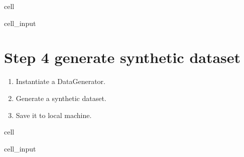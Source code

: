 \documentclass[letterpaper,10pt,english]{jupyterBook}
\begin{document}
\begin{sphinxuseclass}{cell}\begin{sphinxVerbatimInput}

\begin{sphinxuseclass}{cell_input}
\begin{sphinxVerbatim}[commandchars=\\\{\}]
  
\end{sphinxVerbatim}

\end{sphinxuseclass}\end{sphinxVerbatimInput}

\end{sphinxuseclass}

\section{Step 4 generate synthetic dataset}
\label{\detokenize{src/test/SynthNAV0:step-4-generate-synthetic-dataset}}\begin{enumerate}
%
\item {} 
\sphinxAtStartPar
Instantiate a DataGenerator.

\item {} 
\sphinxAtStartPar
Generate a synthetic dataset.

\item {} 
\sphinxAtStartPar
Save it to local machine.

\end{enumerate}

\begin{sphinxuseclass}{cell}\begin{sphinxVerbatimInput}

\begin{sphinxuseclass}{cell_input}
\begin{sphinxVerbatim}[commandchars=\\\{\}]
  
 
\end{sphinxVerbatim}

\end{sphinxuseclass}\end{sphinxVerbatimInput}

\end{sphinxuseclass}
\end{document}
